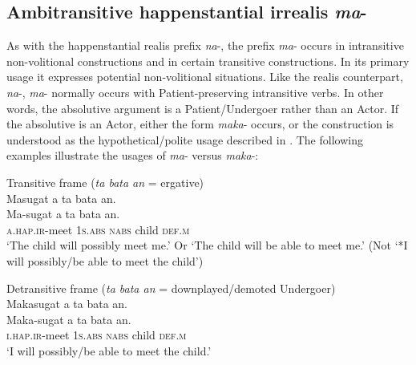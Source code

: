 \subsection{Ambitransitive happenstantial irrealis \textit{ma}{}-}
\label{sec:ambitransitivehappenstantialirrealis}

As with the happenstantial realis prefix \textit{na}{}-, the prefix \textit{ma}{}- occurs in intransitive non-volitional constructions and in certain transitive constructions. In its primary usage it expresses potential non-volitional situations. Like the realis counterpart, \textit{na}{}-, \textit{ma}{}- normally occurs with Patient-preserving intransitive verbs. In other words, the absolutive argument is a Patient/Undergoer rather than an Actor. If the absolutive is an Actor, either the form \textit{maka}{}- occurs, or the construction is understood as the hypothetical/polite usage described in . The following examples illustrate the usages of \textit{ma}{}- versus \textit{maka}{}-: 

\ea
    \ea Transitive frame (\textit{ta bata an} = ergative) \\ 
    Masugat  a  ta  bata  an. \\\smallskip
\gll Ma-sugat  a  ta  bata  an. \\
    \textsc{a.hap.ir}-meet  1\textsc{s.abs}  \textsc{nabs}  child  \textsc{def.m} \\
    \glt ‘The child will possibly meet me.’ Or ‘The child will be able to meet me.’    (Not ‘*I will possibly/be able to meet the child’)

    \ex Detransitive frame (\textit{ta bata an} = downplayed/demoted Undergoer) \\
    Makasugat  a  ta  bata  an. \\\smallskip
\gll Maka-sugat  a  ta  bata  an. \\
    \textsc{i.hap.ir}-meet  1\textsc{s.abs}  \textsc{nabs}  child  \textsc{def.m} \\
    \glt ‘I will possibly/be able to meet the child.’
    
